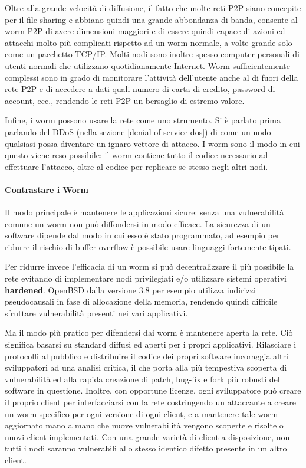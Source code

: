 Oltre alla grande velocità di diffusione, il fatto che molte reti P2P siano concepite per il file-sharing e abbiano quindi una grande abbondanza di banda, consente al worm P2P di avere dimensioni maggiori e di essere quindi capace di azioni ed attacchi molto più complicati rispetto ad un worm normale, a volte grande solo come un pacchetto TCP/IP. Molti nodi sono inoltre spesso computer personali di utenti normali che utilizzano quotidianamente Internet. Worm sufficientemente complessi sono in grado di monitorare l'attività dell'utente anche al di fuori della rete P2P e di accedere a dati quali numero di carta di credito, password di account, ecc., rendendo le reti P2P un bersaglio di estremo valore.

Infine, i worm possono usare la rete come uno strumento. Si è parlato prima parlando del DDoS (nella sezione \ref{denial-of-service-dos}) di come un nodo qualsiasi possa diventare un ignaro vettore di attacco. I worm sono il modo in cui questo viene reso possibile: il worm contiene tutto il codice necessario ad effettuare l'attacco, oltre al codice per replicare se stesso negli altri nodi.

\paragraph{Contrastare i Worm}\label{contrastare-i-worm}

Il modo principale è mantenere le applicazioni sicure: senza una vulnerabilità comune un worm non può diffondersi in modo efficace. La sicurezza di un software dipende dal modo in cui esso è stato programmato, ad esempio per ridurre il rischio di buffer overflow è possibile usare linguaggi fortemente tipati.

Per ridurre invece l'efficacia di un worm si può decentralizzare il più possibile la rete evitando di implementare nodi privilegiati e/o utilizzare sistemi operativi \textbf{hardened}. OpenBSD dalla versione 3.8 per esempio utilizza indirizzi pseudocausali in fase di allocazione della memoria, rendendo quindi difficile sfruttare vulnerabilità presenti nei vari applicativi.

Ma il modo più pratico per difendersi dai worm è mantenere aperta la rete. Ciò significa basarsi su standard diffusi ed aperti per i propri applicativi. Rilasciare i protocolli al pubblico e distribuire il codice dei propri software incoraggia altri sviluppatori ad una analisi critica, il che porta alla più tempestiva scoperta di vulnerabilità ed alla rapida creazione di patch, bug-fix e fork più robusti del software in questione. Inoltre, con opportune licenze, ogni sviluppatore può creare il proprio client per interfacciarsi con la rete costringendo un attaccante a creare un worm specifico per ogni versione di ogni client, e a mantenere tale worm aggiornato mano a mano che nuove vulnerabilità vengono scoperte e risolte o nuovi client implementati. Con una grande varietà di client a disposizione, non tutti i nodi saranno vulnerabili allo stesso identico difetto presente in un altro client.

